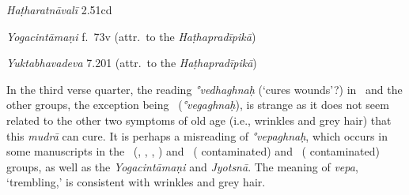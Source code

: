 \begin{ekdosis}
\begin{testimonia}[hp03_029]
\emph{Haṭharatnāvalī} 2.51cd
\begin{versinnote}
\end{versinnote}

\emph{Yogacintāmaṇi} f.~73v (attr.~to the \emph{Haṭhapradīpikā})
\begin{versinnote}
\end{versinnote}

\emph{Yuktabhavadeva} 7.201 (attr.~to the \emph{Haṭhapradīpikā})
\begin{versinnote}
\end{versinnote}

\end{testimonia}

\begin{philcomm}[hp03_029]
In the third verse quarter, the reading \emph{°vedhaghnaḥ} (`cures wounds'?) in \textalpha\ and the other groups, the exception being \textgamma\ (\emph{°vegaghnaḥ}), is strange as it does not seem related to the other two symptoms of old age (i.e., wrinkles and grey hair) that this \emph{mudrā} can cure. It is perhaps a misreading of \emph{°vepaghnaḥ}, 
which occurs in some manuscripts in the \deltaOmega\ (, , , ) and \textbeta\ ( contaminated) and \textzeta\ ( contaminated) groups, %
as well as the \emph{Yogacintāmaṇi} and \emph{Jyotsnā}. The meaning of \emph{vepa}, `trembling,' is consistent with wrinkles and grey hair.

\end{philcomm}


\end{ekdosis}
